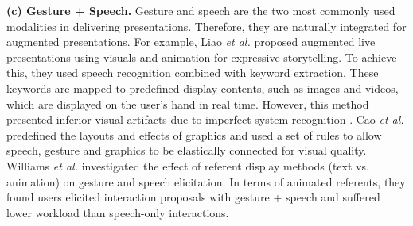 \documentclass[review]{fcs}
\newcommand{\revise}[2]{\textcolor[rgb]{0,0,0}{#2}}
\begin{document}
\textbf{(c) Gesture + Speech.} Gesture and speech are the two most commonly used modalities in delivering presentations. Therefore, they are naturally integrated for augmented presentations. For example,
\revise{Liao \textit{et al.} proposed to augmented live presentations using visuals and animation for expressive storytelling \cite{DBLP:conf/uist/LiaoKJKS22}.To achieve this, they used speech recognition combined with keyword extraction. These keywords are mapped to predefined display contents, such as images and videos. These contents are displayed on the hand in real time.}{Liao \textit{et al.} \cite{DBLP:conf/uist/LiaoKJKS22} proposed augmented live presentations using visuals and animation for expressive storytelling. To achieve this, they used speech recognition combined with keyword extraction. These keywords are mapped to predefined display contents, such as images and videos, which are displayed on the user's hand in real time.} 
However, this method presented inferior visual artifacts due to imperfect system recognition \cite{DBLP:conf/chi/CaoKWAX24}. 
\revise{Cao \textit{et al.} predefined the layouts and effects of graphics and used a set of rules to allow speech, gesture and graphics to be elastically connected for visual quality \cite{DBLP:conf/chi/CaoKWAX24}.}{Cao \textit{et al.} \cite{DBLP:conf/chi/CaoKWAX24} predefined the layouts and effects of graphics and used a set of rules to allow speech, gesture and graphics to be elastically connected for visual quality.}
\revise{Williams \textit{et al.} investigated the effect of referent display methods (text vs. animation) on gesture and speech elicitation \cite{9873984}. In terms of animated referents, they found users elicited interaction proposals with gesture+speech, feeling lower workload than speech only conditions. }{Williams \textit{et al.} \cite{9873984} investigated the effect of referent display methods (text vs. animation) on gesture and speech elicitation. In terms of animated referents, they found users elicited interaction proposals with gesture + speech and suffered lower workload than speech-only interactions. }
\end{document}

